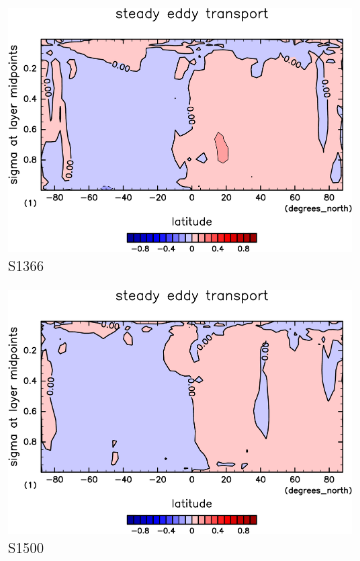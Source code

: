 \documentclass[body]{subfiles}
\begin{document}
\begin{figure}[t]
	\centering
	\begin{subfigure}{.4\textwidth}
		\centering
		\includegraphics[width=\columnwidth]{S1366/MeriHeatTransTest@latentEn_SE,time=14600:14965-crop-rotate.pdf}
		\caption{S1366}\label{潜熱停滞性擾乱S1366}
	\end{subfigure}
	\begin{subfigure}{.4\textwidth}
		\centering
		\includegraphics[width=\columnwidth]{S1500/MeriHeatTransTest@latentEn_SE,time=3650:4015-crop-rotate.pdf}
		\caption{S1500}\label{潜熱停滞性擾乱S1500}
	\end{subfigure}
	\begin{subfigure}{.4\textwidth}
		\centering

\end{subfigure}
\end{figure}
\end{document}
